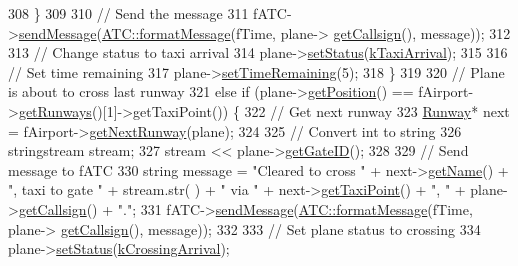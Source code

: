\begin{DoxyCode}
308             \}
309 
310             \textcolor{comment}{// Send the message}
311             fATC->\hyperlink{classATC_aa78b32354d28f3f2eac0143df617283b}{sendMessage}(\hyperlink{classATC_a2fca67fc154c7d8a6c14198697653059}{ATC::formatMessage}(fTime, plane->
      \hyperlink{classAirplane_a6a62bd06d28789336c5ce1543d9391f1}{getCallsign}(), message));
312 
313             \textcolor{comment}{// Change status to taxi arrival}
314             plane->\hyperlink{classAirplane_a23934fb97d8fab12d4dc790cee673747}{setStatus}(\hyperlink{Airplane_8h_a0e5bbf7c6c727baaba49062300fae19fabe52f2e86df226a44cc8ba29e8f259b2}{kTaxiArrival});
315 
316             \textcolor{comment}{// Set time remaining}
317             plane->\hyperlink{classAirplane_a43e7b856df001168956ed6d115943ec9}{setTimeRemaining}(5);
318         \}
319 
320         \textcolor{comment}{// Plane is about to cross last runway}
321         \textcolor{keywordflow}{else} \textcolor{keywordflow}{if} (plane->\hyperlink{classAirplane_ab4fa66c0adb05725a51524265f8c520c}{getPosition}() == fAirport->\hyperlink{classAirport_a14310ffeba8a024105071c156fd42cf7}{getRunways}()[1]->getTaxiPoint()) \{
322             \textcolor{comment}{// Get next runway}
323             \hyperlink{classRunway}{Runway}* next = fAirport->\hyperlink{classAirport_a894669e2c8865a6c0442004e7e75063c}{getNextRunway}(plane);
324 
325             \textcolor{comment}{// Convert int to string}
326             stringstream stream;
327             stream << plane->\hyperlink{classAirplane_acab03ea6ec6df824368bf9851316e140}{getGateID}();
328 
329             \textcolor{comment}{// Send message to fATC}
330             \textcolor{keywordtype}{string} message = \textcolor{stringliteral}{"Cleared to cross "} + next->\hyperlink{classRunway_a2934c38f3af6080f7b40c306a27c57cd}{getName}() + \textcolor{stringliteral}{", taxi to gate "} + stream.str(
      ) + \textcolor{stringliteral}{" via "} + next->\hyperlink{classRunway_ad2d8fd5696ec93e2fa3d32bec3d02f59}{getTaxiPoint}() + \textcolor{stringliteral}{", "} + plane->\hyperlink{classAirplane_a6a62bd06d28789336c5ce1543d9391f1}{getCallsign}() + \textcolor{stringliteral}{"."};
331             fATC->\hyperlink{classATC_aa78b32354d28f3f2eac0143df617283b}{sendMessage}(\hyperlink{classATC_a2fca67fc154c7d8a6c14198697653059}{ATC::formatMessage}(fTime, plane->
      \hyperlink{classAirplane_a6a62bd06d28789336c5ce1543d9391f1}{getCallsign}(), message));
332 
333             \textcolor{comment}{// Set plane status to crossing}
334             plane->\hyperlink{classAirplane_a23934fb97d8fab12d4dc790cee673747}{setStatus}(\hyperlink{Airplane_8h_a0e5bbf7c6c727baaba49062300fae19fac8a18187b65420ae9ceda0d5073512ce}{kCrossingArrival});

\end{DoxyCode}
